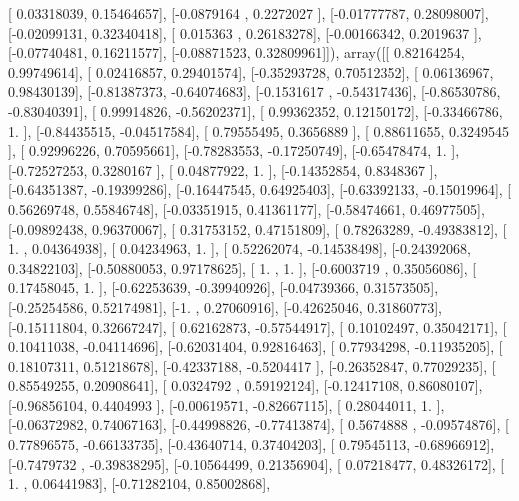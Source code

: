 \documentclass{article}
\begin{document}
       [ 0.03318039,  0.15464657],
       [-0.0879164 ,  0.2272027 ],
       [-0.01777787,  0.28098007],
       [-0.02099131,  0.32340418],
       [ 0.015363  ,  0.26183278],
       [-0.00166342,  0.2019637 ],
       [-0.07740481,  0.16211577],
       [-0.08871523,  0.32809961]]), array([[ 0.82164254,  0.99749614],
       [ 0.02416857,  0.29401574],
       [-0.35293728,  0.70512352],
       [ 0.06136967,  0.98430139],
       [-0.81387373, -0.64074683],
       [-0.1531617 , -0.54317436],
       [-0.86530786, -0.83040391],
       [ 0.99914826, -0.56202371],
       [ 0.99362352,  0.12150172],
       [-0.33466786,  1.        ],
       [-0.84435515, -0.04517584],
       [ 0.79555495,  0.3656889 ],
       [ 0.88611655,  0.3249545 ],
       [ 0.92996226,  0.70595661],
       [-0.78283553, -0.17250749],
       [-0.65478474,  1.        ],
       [-0.72527253,  0.3280167 ],
       [ 0.04877922,  1.        ],
       [-0.14352854,  0.8348367 ],
       [-0.64351387, -0.19399286],
       [-0.16447545,  0.64925403],
       [-0.63392133, -0.15019964],
       [ 0.56269748,  0.55846748],
       [-0.03351915,  0.41361177],
       [-0.58474661,  0.46977505],
       [-0.09892438,  0.96370067],
       [ 0.31753152,  0.47151809],
       [ 0.78263289, -0.49383812],
       [ 1.        ,  0.04364938],
       [ 0.04234963,  1.        ],
       [ 0.52262074, -0.14538498],
       [-0.24392068,  0.34822103],
       [-0.50880053,  0.97178625],
       [ 1.        ,  1.        ],
       [-0.6003719 ,  0.35056086],
       [ 0.17458045,  1.        ],
       [-0.62253639, -0.39940926],
       [-0.04739366,  0.31573505],
       [-0.25254586,  0.52174981],
       [-1.        ,  0.27060916],
       [-0.42625046,  0.31860773],
       [-0.15111804,  0.32667247],
       [ 0.62162873, -0.57544917],
       [ 0.10102497,  0.35042171],
       [ 0.10411038, -0.04114696],
       [-0.62031404,  0.92816463],
       [ 0.77934298, -0.11935205],
       [ 0.18107311,  0.51218678],
       [-0.42337188, -0.5204417 ],
       [-0.26352847,  0.77029235],
       [ 0.85549255,  0.20908641],
       [ 0.0324792 ,  0.59192124],
       [-0.12417108,  0.86080107],
       [-0.96856104,  0.4404993 ],
       [-0.00619571, -0.82667115],
       [ 0.28044011,  1.        ],
       [-0.06372982,  0.74067163],
       [-0.44998826, -0.77413874],
       [ 0.5674888 , -0.09574876],
       [ 0.77896575, -0.66133735],
       [-0.43640714,  0.37404203],
       [ 0.79545113, -0.68966912],
       [-0.7479732 , -0.39838295],
       [-0.10564499,  0.21356904],
       [ 0.07218477,  0.48326172],
       [ 1.        ,  0.06441983],
       [-0.71282104,  0.85002868],
\end{document}
